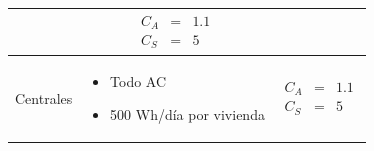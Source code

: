 \begin{table}
\begin{tabular}{>{\centering}p{2cm}>{\centering}p{6cm}>{\centering}p{3cm}}
\begin{itemize}
\end{itemize}
 & \begin{eqnarray*}
C_{A} & = & 1.1\\
C_{S} & = & 5\end{eqnarray*}
\tabularnewline
\midrule 
Centrales & \begin{itemize}
\item Todo AC 
\item 500 Wh/día por vivienda
\end{itemize}
 & \begin{eqnarray*}
C_{A} & = & 1.1\\
C_{S} & = & 5\end{eqnarray*}
\tabularnewline
\end{tabular}
\end{table}

